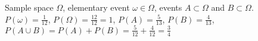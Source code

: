 \begin{figure}
\centering



\caption{Sample space $\Omega$, elementary event 
  $\omega \in \Omega$, events $A \subset \Omega$ and
$B \subset \Omega$. 
$P\left(\omega\right) = \frac{1}{12}$, 
$P\left(\Omega\right) = \frac{12}{12} = 1$,
$P\left(A\right) = \frac{5}{13}$,
$P\left(B\right) = \frac{4}{13}$,
$P\left(A\cup B\right) = 
P\left(A\right) + P\left(B\right) = 
\frac{5}{12} + \frac{4}{12} = \frac{3}{4}$
}
\label{figAddProbabilityAxioms}
\end{figure}